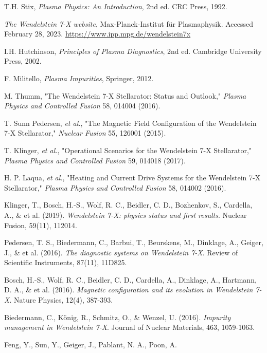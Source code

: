 \documentclass[12pt]{article}
\begin{document}
\begin{thebibliography}{9}

T.H. Stix, {\em Plasma Physics: An Introduction}, 2nd ed. CRC Press, 1992.

{\em The Wendelstein 7-X website}, Max-Planck-Institut für Plasmaphysik. Accessed February 28, 2023. \url{https://www.ipp.mpg.de/wendelstein7x}

I.H. Hutchinson, {\em Principles of Plasma Diagnostics}, 2nd ed. Cambridge University Press, 2002.

F. Militello, {\em Plasma Impurities}, Springer, 2012.

M. Thumm, "The Wendelstein 7-X Stellarator: Status and Outlook," {\em Plasma Physics and Controlled Fusion} 58, 014004 (2016).

T. Sunn Pedersen, {\em et al.}, "The Magnetic Field Configuration of the Wendelstein 7-X Stellarator," {\em Nuclear Fusion} 55, 126001 (2015).

T. Klinger, {\em et al.}, "Operational Scenarios for the Wendelstein 7-X Stellarator," {\em Plasma Physics and Controlled Fusion} 59, 014018 (2017).

H. P. Laqua, {\em et al.}, "Heating and Current Drive Systems for the Wendelstein 7-X Stellarator," {\em Plasma Physics and Controlled Fusion} 58, 014002 (2016).

Klinger, T., Bosch, H.-S., Wolf, R. C., Beidler, C. D., Bozhenkov, S., Cardella, A., \& et al. (2019).
\textit{Wendelstein 7-X: physics status and first results}.
Nuclear Fusion, 59(11), 112014.

Pedersen, T. S., Biedermann, C., Barbui, T., Beurskens, M., Dinklage, A., Geiger, J., \& et al. (2016).
\textit{The diagnostic systems on Wendelstein 7-X}.
Review of Scientific Instruments, 87(11), 11D825.

Bosch, H.-S., Wolf, R. C., Beidler, C. D., Cardella, A., Dinklage, A., Hartmann, D. A., \& et al. (2016).
\textit{Magnetic configuration and its evolution in Wendelstein 7-X}.
Nature Physics, 12(4), 387-393.

Biedermann, C., König, R., Schmitz, O., \& Wenzel, U. (2016).
\textit{Impurity management in Wendelstein 7-X}.
Journal of Nuclear Materials, 463, 1059-1063.

Feng, Y., Sun, Y., Geiger, J., Pablant, N. A., Poon, A.

\end{thebibliography}
\end{document}
